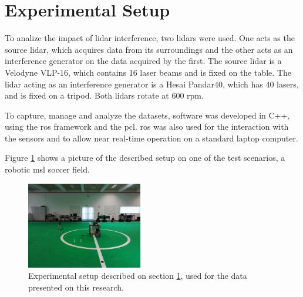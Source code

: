 \documentclass[extendedabs]{recpad2k}
\def\etal{\emph{et al}\bmvaOneDot}
\begin{document}



\section{Experimental Setup}
\label{sec:experimental_setup}
To analize the impact of \gls{lidar} interference, two \gls{lidar}s were used. One acts as the source \gls{lidar}, which acquires data from its surroundings and the other acts as an interference generator on the data acquired by the first.  
The source \gls{lidar} is a Velodyne VLP-16, which contains 16 laser beams and is fixed on the table. The \gls{lidar} acting as an interference generator is a Hesai Pandar40, which has 40 lasers, and is fixed on a tripod. Both \gls{lidar}s rotate at 600 \gls{rpm}.


To capture, manage and analyze the datasets, software was developed in C++, using the \gls{ros} framework and the \gls{pcl}. \gls{ros} was also used for the interaction with the sensors and to allow near real-time operation on a standard laptop computer.

Figure \ref{fig:experimental_setup} shows a picture of the described setup on one of the test scenarios, a robotic \gls{msl} soccer field.

\begin{figure}[h]
    \centering
    \includegraphics[width=0.45\textwidth]{images/CAMBADA_experimenta_setup.jpg}
    \caption{Experimental setup described on section \ref{sec:experimental_setup}, used for the data presented on this research.}
    \label{fig:experimental_setup}
\end{figure}
\end{document}

